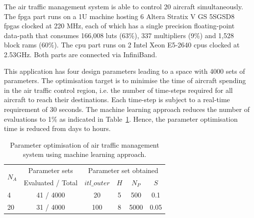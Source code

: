 The air traffic management system is able to control 20 aircraft simultaneously.
The \gls{fpga} part runs on a 1U machine hosting 6 Altera Stratix V GS 5SGSD8 \glspl{fpga} clocked at 220 MHz, 
each of which has a single precision floating-point data-path that consumes 166,008 \glspl{lut} (63\%), 337 multipliers (9\%) and 1,528 block \glspl{ram} (60\%).
The \gls{cpu} part runs on 2 Intel Xeon E5-2640 \glspl{cpu} clocked at 2.53GHz.
Both parts are connected via InfiniBand.

This application has four design parameters leading to a space with 4000 sets of parameters.
The optimisation target is to minimise the time of aircraft spending in the air traffic control region,
i.e. the number of time-steps required for all aircraft to reach their destinations.
Each time-step is subject to a real-time requirement of 30 seconds.
The machine learning approach reduces the number of evaluations to 1\% as indicated in Table~\ref{tab:dse}.
Hence, the parameter optimisation time is reduced from days to hours.

\begin{table}[ht]
	\begin{spacing}{1.0}
	\caption{Parameter optimisation of air traffic management system using machine learning approach.}
	\label{tab:dse}
	\centering
	\smallskip
	\begin{threeparttable}
		\begin{tabular}{l|c|c c c c}
			\hline
			\multirow{2}{*}{$N_A$}			& Parameter	sets		& \multicolumn{4}{|c}{Parameter set obtained} \\
			\cline{3-6}
																	& Evaluated / Total					& $itl\_outer$  		& $H$ & $N_P$ & $S$ \\
			\hline
			\hline
			4 													& 41 / 4000											& 20								&	5		&	500	  & 0.1 \\
			20													& 31 / 4000 											& 100								&	8		&	5000	& 0.05 \\
			\hline
		\end{tabular}
	\end{threeparttable}
	\end{spacing}
\end{table}


